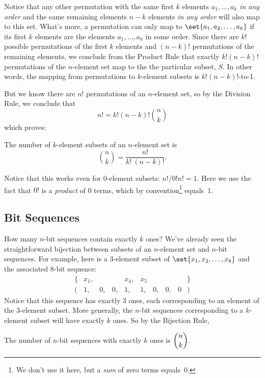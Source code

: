 Notice that any other permutation with the same first $k$ elements
$a_1,\dots,a_k$ \emph{in any order} and the same remaining elements $n-k$
elements \emph{in any order} will also map to this set.  What's more, a
permutation can only map to $\set{a_1,a_2,\dots,a_k}$ if its first $k$
elements are the elements $a_1,\dots,a_k$ in some order.  Since there are
$k!$ possible permutations of the first $k$ elements and $(n-k)!$
permutations of the remaining elements, we conclude from the Product Rule
that exactly $k!(n-k)!$ permutations of the $n$-element set map to the the
particular subset, $S$.  In other words, the mapping from permutations to
$k$-element subsets is $k!(n-k)!$-to-1.

But we know there are $n!$ permutations of an $n$-element set, so by the
Division Rule, we conclude that
\[
n!= k!(n-k)!\binom{n}{k}
\]
which proves:
\begin{rul}
\label{rule:subset}
The number of $k$-element subsets of an $n$-element set is
\begin{equation*}
    \binom{n}{k} = \frac{n!}{k!\ (n-k)!}.
\end{equation*}
\end{rul}

Notice that this works even for 0-element subsets: $n!/0!n! = 1$.  Here we
use the fact that $0!$ is a \emph{product} of 0 terms, which by
convention\footnote{We don't use it here, but a \emph{sum} of zero
  terms equals~0.}
equals~1.

\subsection{Bit Sequences}

How many $n$-bit sequences contain exactly $k$ ones?  We've already seen
the straightforward bijection between subsets of an $n$-element set and
$n$-bit sequences.  For example, here is a 3-element subset of $\set{x_1,
x_2, \ldots, x_8}$ and the associated 8-bit sequence:
%
\[
\begin{array}{rccccccccl}
\{ & x_1, &    &    & x_4, & x_5  &    &    &   & \} \\
(  &   1, & 0, & 0, &   1, &   1, & 0, & 0, & 0 & )
\end{array}
\]
Notice that this sequence has exactly 3 ones, each corresponding to an
element of the 3-element subset.  More generally, the $n$-bit sequences
corresponding to a $k$-element subset will have exactly $k$ ones.  So by
the Bijection Rule,
\begin{corollary*}
The number of $n$-bit sequences with exactly $k$ ones is $\dbinom{n}{k}$.
\end{corollary*}

